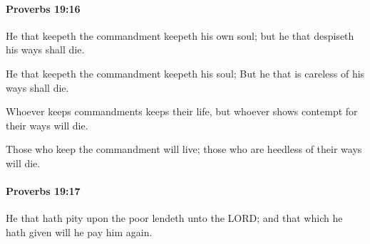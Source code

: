 		\paragraph{Proverbs 19:16} %
			\label{PROVERBS-19-16}

			He that keepeth the commandment keepeth his own soul; but he that despiseth his ways shall die.

			\begin{versebox}
					\item[BHS] 
					\item[ASV] He that keepeth the commandment keepeth his soul; But he that is careless of his ways shall die.
					\item[NIV] Whoever keeps commandments keeps their life, but whoever shows contempt for their ways will die.
					\item[NRSV] Those who keep the commandment will live; those who are heedless of their ways will die.
			\end{versebox}

		\paragraph{Proverbs 19:17} %
			\label{PROVERBS-19-17}

			He that hath pity upon the poor lendeth unto the LORD; and that which he hath given will he pay him again.

